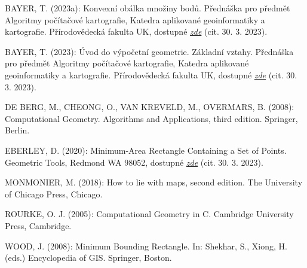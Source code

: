 \begin{thebibliography}{9}

BAYER, T. (2023a): Konvexní obálka množiny bodů. Přednáška pro předmět Algoritmy počítačové kartografie, Katedra aplikované geoinformatiky a kartografie. Přírodovědecká fakulta UK, dostupné \href{http://web.natur.cuni.cz/~bayertom/images/courses/Adk/adk4_new.pdf}{\emph{zde}} (cit. 30. 3. 2023).

BAYER, T. (2023): Úvod do výpočetní geometrie. Základní vztahy. Přednáška pro předmět Algoritmy počítačové kartografie, Katedra aplikované geoinformatiky a kartografie. Přírodovědecká fakulta UK, dostupné \href{http://web.natur.cuni.cz/~bayertom/images/courses/Adk/adk2.pdf}{\emph{zde}} (cit. 30. 3. 2023).

DE BERG, M., CHEONG, O., VAN KREVELD, M., OVERMARS, B. (2008): Computational Geometry. Algorithms and Applications, third edition. Springer, Berlin.

EBERLEY, D. (2020): Minimum-Area Rectangle Containing a Set of Points. Geometric Tools, Redmond WA 98052, dostupné \href{https://www.geometrictools.com/Documentation/MinimumAreaRectangle.pdf}{\emph{zde}} (cit. 30. 3. 2023).


MONMONIER, M. (2018): How to lie with maps, second edition. The University of Chicago Press, Chicago.

ROURKE, O. J. (2005): Computational Geometry in C. Cambridge University Press, Cambridge.

WOOD, J. (2008): Minimum Bounding Rectangle. In: Shekhar, S., Xiong, H. (eds.) Encyclopedia of GIS. Springer, Boston.
\end{thebibliography}